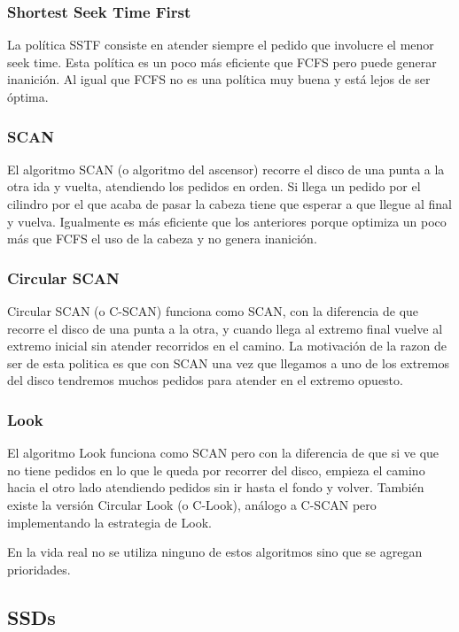 \documentclass{article}
\begin{document}
\subsubsection{Shortest Seek Time First}

La pol\'itica SSTF consiste en atender siempre el pedido que involucre el menor seek time. Esta pol\'itica es un poco m\'as eficiente que FCFS pero puede generar inanici\'on. Al igual que FCFS no es una pol\'itica muy buena y est\'a lejos de ser \'optima.

\subsubsection{SCAN}

El algoritmo SCAN (o algoritmo del ascensor) recorre el disco de una punta a la otra ida y vuelta, atendiendo los pedidos en orden. Si llega un pedido por el cilindro por el que acaba de pasar la cabeza tiene que esperar a que llegue al final y vuelva. Igualmente es m\'as eficiente que los anteriores porque optimiza un poco m\'as que FCFS el uso de la cabeza y no genera inanici\'on.

\subsubsection{Circular SCAN}

Circular SCAN (o C-SCAN) funciona como SCAN, con la diferencia de que recorre el disco de una punta a la otra, y cuando llega al extremo final vuelve al extremo inicial sin atender recorridos en el camino. La motivación de la razon de ser de esta politica es que con SCAN una vez que llegamos a uno de los extremos del disco tendremos muchos pedidos para atender en el extremo opuesto.

\subsubsection{Look}

El algoritmo Look funciona como SCAN pero con la diferencia de que si ve que no tiene pedidos en lo que le queda por recorrer del disco, empieza el camino hacia el otro lado atendiendo pedidos sin ir hasta el fondo y volver. Tambi\'en existe la versi\'on Circular Look (o C-Look), análogo a C-SCAN pero implementando la estrategia de Look.

En la vida real no se utiliza ninguno de estos algoritmos sino que se agregan prioridades.

\subsection{SSDs}
\end{document}
